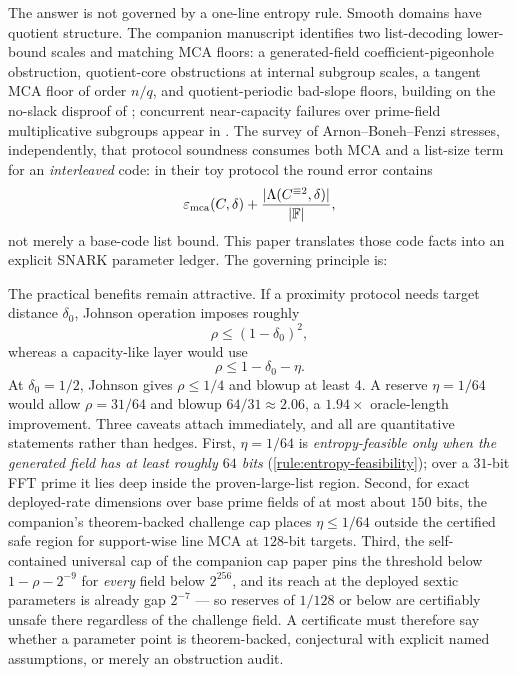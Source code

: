 \documentclass[11pt]{article}
\theoremstyle{definition}
\newcommand{\F}{\mathbb F}
\newcommand{\mca}{\varepsilon_{\rm mca}}
\newcommand{\Int}[2]{#1^{\equiv #2}}
\begin{document}
The answer is not governed by a one-line entropy rule.  Smooth domains have quotient structure.  The companion manuscript \cite{SlackMCAEntropyMerged} identifies two list-decoding lower-bound scales and matching MCA floors: a generated-field coefficient-pigeonhole obstruction, quotient-core obstructions at internal subgroup scales, a tangent MCA floor of order $n/q$, and quotient-periodic bad-slope floors, building on the no-slack disproof of \cite{NoSlack}; concurrent near-capacity failures over prime-field multiplicative subgroups appear in \cite{KKH26,Kambire26}.  The survey of Arnon--Boneh--Fenzi \cite{ABF26} stresses, independently, that protocol soundness consumes both MCA and a list-size term for an \emph{interleaved} code: in their toy protocol the round error contains
\[
        \mca(C,\delta)+\frac{|\Lambda(\Int{C}{2},\delta)|}{|\F|},
\]
not merely a base-code list bound.  This paper translates those code facts into an explicit SNARK parameter ledger.  The governing principle is:
\begin{center}
\end{center}

The practical benefits remain attractive.  If a proximity protocol needs target distance $\delta_0$, Johnson operation imposes roughly
\[
        \rho\le (1-\delta_0)^2,
\]
whereas a capacity-like layer would use
\[
        \rho\le 1-\delta_0-\eta .
\]
At $\delta_0=1/2$, Johnson gives $\rho\le1/4$ and blowup at least $4$.  A reserve $\eta=1/64$ would allow $\rho=31/64$ and blowup $64/31\approx2.06$, a $1.94\times$ oracle-length improvement.  Three caveats attach immediately, and all are quantitative statements rather than hedges.  First, $\eta=1/64$ is \emph{entropy-feasible only when the generated field has at least roughly $64$ bits} (\cref{rule:entropy-feasibility}); over a $31$-bit FFT prime it lies deep inside the proven-large-list region.  Second, for exact deployed-rate dimensions over base prime fields of at most about $150$ bits, the companion's theorem-backed challenge cap places $\eta\le1/64$ outside the certified safe region for support-wise line MCA at $128$-bit targets.  Third, the self-contained universal cap of the companion cap paper \cite{UniversalCap} pins the threshold below $1-\rho-2^{-9}$ for \emph{every} field below $2^{256}$, and its reach at the deployed sextic parameters is already gap $2^{-7}$ --- so reserves of $1/128$ or below are certifiably unsafe there regardless of the challenge field.  A certificate must therefore say whether a parameter point is theorem-backed, conjectural with explicit named assumptions, or merely an obstruction audit.
\end{document}
